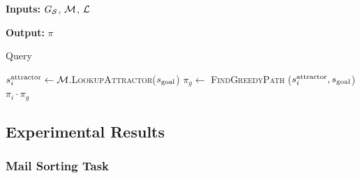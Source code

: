 \documentclass[a4paper,10pt]{article}
\begin{document}
{\begin{algorithm}[t]
\begin{algorithmic}[1]
\EndProcedure
\end{algorithmic}
\end{algorithm}

\begin{algorithm}[t]
\hspace*{\algorithmicindent} \textbf{Inputs:} $G_\mathcal{S}$, $\mathcal{M}$, $\mathcal{L}$

\hspace*{\algorithmicindent} \textbf{Output:} $\pi$	
\caption{Query}\label{alg:3}

\begin{algorithmic}[1]

%

    \State $s^{\text{attractor}}_i \leftarrow \mathcal{M}$.\textsc{LookupAttractor}($s_{\text{goal}}$)
      \State $\pi_g \leftarrow$ \textsc{FindGreedyPath} ($s^{\text{attractor}}_i, s_{\text{goal}}$)
      \State \Return $\pi_i \cdot \pi_g$  

\EndProcedure
\end{algorithmic}
\end{algorithm}
}

\subsection{Experimental Results}
\label{sec:eval}

\subsubsection{Mail Sorting Task}
\end{document}
